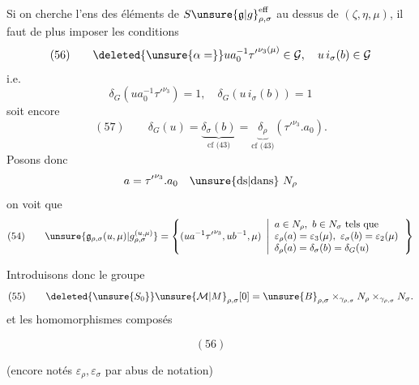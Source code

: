 Si on cherche l'ens des éléments de
\(S\unsure{\mathfrak{g}|g}_{\rho,\sigma}^{\mathrm{eff}}\)
au dessus de \((\zeta,\eta,\mu)\), il faut de plus
imposer les conditions
\[
(56)\qquad
\deleted{\unsure{\alpha=}}ua_0^{-1}{\tau'}^{\nu_3(\mu)}\in\mathcal{G},
\quad u\,i_\sigma(b)\in\mathcal{G}
\]
i.e.
\[
\delta_G(ua_0^{-1}{\tau'}^{\nu_3})=1,\quad
\delta_G(u\,i_\sigma(b))=1
\]
soit encore
\[
(57)\qquad
\delta_G(u)=
\underbrace{\delta_\sigma(b)}_{\text{cf (43)}}
=
\underbrace{\delta_\rho}_{\text{cf (43)}}
({\tau'}^{\nu_3}.a_0).
\]
Posons donc
\[
a={\tau'}^{\nu_3}.a_0\quad\text{\unsure{ds|dans}}\ N_\rho
\]
on voit que
\[
(54)\qquad
\unsure{\mathfrak{g}_{\rho,\sigma}(u,\mu)|g_{\rho,\sigma}^{(u,\mu)}}
=
\left\{(ua^{-1}{\tau'}^{\nu_3},ub^{-1},\mu)\ \left|
\begin{array}{l}
a\in N_\rho,\ b\in N_\sigma\ \text{tels que}\\
\varepsilon_\rho(a)=\varepsilon_3(\mu),\
\varepsilon_\sigma(b)=\varepsilon_2(\mu)\\
\delta_\rho(a)=\delta_\sigma(b)=\delta_G(u)
\end{array}\right.\right\}
\]

Introduisons donc le groupe
\[
(55)\qquad
\deleted{\unsure{S_0}}
\unsure{\mathcal{M}|M}_{\rho,\sigma}[0]
=\unsure{B}_{\rho,\sigma}
\times_{\gamma_{\rho,\sigma}}N_\rho
\times_{\gamma_{\rho,\sigma}}N_\sigma.
\]
et les homomorphismes composés
\begin{samepage}
\[
(56)
\]
\end{samepage}
(encore notés \(\varepsilon_\rho,\varepsilon_\sigma\)
par abus de notation)

